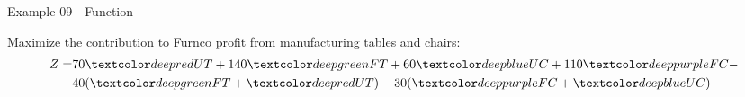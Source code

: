 \begin{frame}{Example 09 - Function}

Maximize the contribution to Furnco profit from manufacturing tables and chairs:
\Large{
\begin{align*}
    Z = &70\colora{UT} + 140\colorb{FT} + 60\colorc{UC} + 110\colord{FC} - \\
        &40(\colorb{FT} + \colora{UT}) - 30(\colord{FC} + \colorc{UC})
\end{align*}
}

\end{frame}
